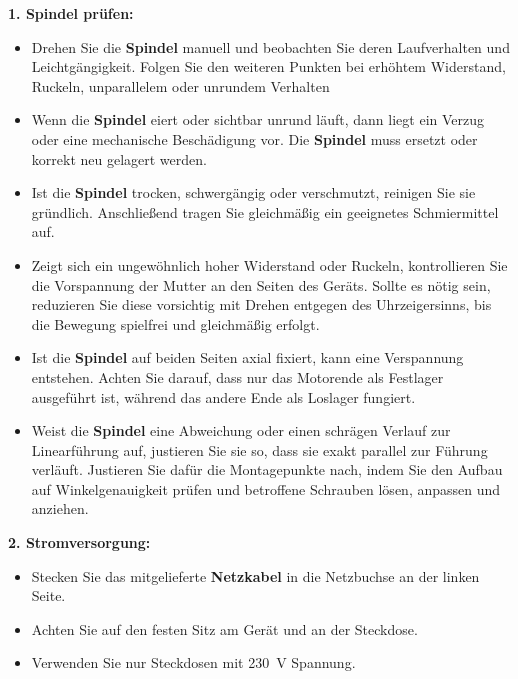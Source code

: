 \documentclass[a4paper,12pt]{report}
\begin{document}
		\noindent\textbf{1. Spindel prüfen:}
		
	    \begin{itemize}[leftmargin=1.5em]
		
		\item Drehen Sie die \textbf{Spindel} manuell und beobachten Sie deren Laufverhalten und Leichtgängigkeit. Folgen Sie den weiteren Punkten bei erhöhtem Widerstand, Ruckeln, unparallelem oder unrundem Verhalten 
		
		\item Wenn die \textbf{Spindel} eiert oder sichtbar unrund läuft, dann liegt ein Verzug oder eine mechanische Beschädigung vor. Die \textbf{Spindel} muss ersetzt oder korrekt neu gelagert werden.
		
		\item Ist die \textbf{Spindel} trocken, schwergängig oder verschmutzt, reinigen Sie sie gründlich. Anschließend tragen Sie gleichmäßig ein geeignetes Schmiermittel auf. 
		
		\item Zeigt sich ein ungewöhnlich hoher Widerstand oder Ruckeln, kontrollieren Sie die Vorspannung der Mutter an den Seiten des Geräts. Sollte es nötig sein, reduzieren Sie diese vorsichtig mit Drehen entgegen des Uhrzeigersinns, bis die Bewegung spielfrei und gleichmäßig erfolgt. 
		
		\item Ist die \textbf{Spindel} auf beiden Seiten axial fixiert, kann eine Verspannung entstehen. Achten Sie darauf, dass nur das Motorende als Festlager ausgeführt ist, während das andere Ende als Loslager fungiert.
		
		\item Weist die \textbf{Spindel} eine Abweichung oder einen schrägen Verlauf zur Linearführung auf, justieren Sie sie so, dass sie exakt parallel zur Führung verläuft. Justieren Sie dafür die Montagepunkte nach, indem Sie den Aufbau auf Winkelgenauigkeit prüfen und betroffene Schrauben lösen, anpassen und anziehen.\\ 
	    \end{itemize}
		
		
		\noindent\textbf{2. Stromversorgung:}
		
		\begin{itemize}[leftmargin=1.5em]
		
		\item Stecken Sie das mitgelieferte \textbf{Netzkabel} in die Netzbuchse an der linken Seite. 
		\item Achten Sie auf den festen Sitz am Gerät und an der Steckdose. 
		\item Verwenden Sie nur Steckdosen mit 230\ V Spannung. \\
    	\end{itemize}
		
\end{document}
